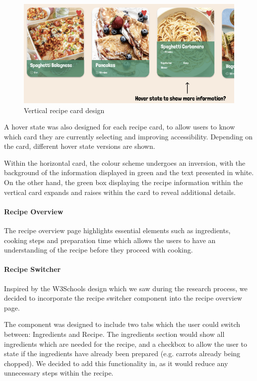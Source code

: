 \documentclass{article}
\begin{document}
\begin{figure}[h]
  \includegraphics[width=1.0\textwidth]{assets/design-images/Version 1 Vertical Cards.png}
  \centering
  \caption{Vertical recipe card design}
\end{figure}

A hover state was also designed for each recipe card, to allow users to know
which card they are currently selecting and improving accessibility. Depending
on the card, different hover state versions are shown.

Within the horizontal card, the colour scheme undergoes an inversion, with the
background of the information displayed in green and the text presented in
white. On the other hand, the green box displaying the recipe information
within the vertical card expands and raises within the card to reveal
additional details.

\paragraph{Recipe Overview}
The recipe overview page highlights essential elements such as ingredients,
cooking steps and preparation time which allows the users to have an
understanding of the recipe before they proceed with cooking.

\paragraph{Recipe Switcher}
Inspired by the W3Schools design which we saw during the research process, we
decided to incorporate the recipe switcher component into the recipe overview
page.

The component was designed to include two tabs which the user could switch
between: Ingredients and Recipe. The ingredients section would show all
ingredients which are needed for the recipe, and a checkbox to allow the user
to state if the ingredients have already been prepared (e.g. carrots already
being chopped). We decided to add this functionality in, as it would reduce any
unnecessary steps within the recipe.
\end{document}

